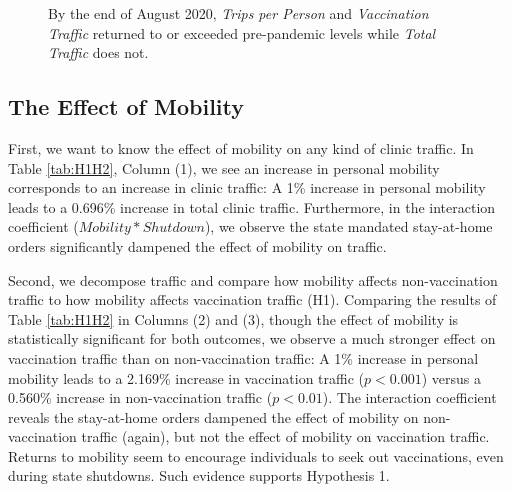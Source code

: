  \begin{figure}
     \centering
     \caption{By the end of August 2020, \textit{Trips per Person} and \textit{Vaccination Traffic} returned to or exceeded pre-pandemic levels while \textit{Total Traffic} does not.} \medskip
     \label{fig:model_free_vc2}
 \end{figure} 

\subsection{The Effect of Mobility}
 First, we want to know the effect of mobility on any kind of clinic traffic. In Table \ref{tab:H1H2}, Column (1), we see an increase in personal mobility corresponds to an increase in clinic traffic: A 1\% increase in personal mobility leads to a 0.696\% increase in total clinic traffic. Furthermore, in the interaction coefficient ($Mobility * Shutdown$), we observe the state mandated stay-at-home orders significantly dampened the effect of mobility on traffic.
 
 Second, we decompose traffic and compare how mobility affects non-vaccination traffic to how mobility affects vaccination traffic (H1). Comparing the results of Table \ref{tab:H1H2} in Columns (2) and (3), though the effect of mobility is statistically significant for both outcomes, we observe a much stronger effect on vaccination traffic than on non-vaccination traffic: A 1\% increase in personal mobility leads to a 2.169\% increase in vaccination traffic ($p < 0.001$) versus a 0.560\% increase in non-vaccination traffic ($p < 0.01$). The interaction coefficient reveals the stay-at-home orders dampened the effect of mobility on non-vaccination traffic (again), but not the effect of mobility on vaccination traffic. Returns to mobility seem to encourage individuals to seek out vaccinations, even during state shutdowns. Such evidence supports Hypothesis 1.
 
